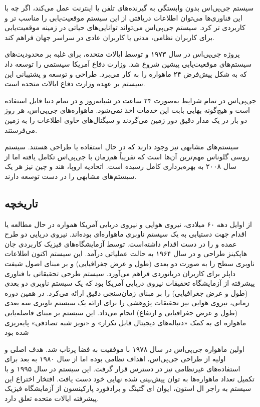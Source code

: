 سیستم جی‌پی‌اس بدون وابستگی به گیرنده‌های تلفن یا اینترنت عمل می‌کند، اگر چه با این فناوری‌ها می‌توان اطلاعات دریافتی از این سیستم موقعیت‌یابی را مناسب تر و کاربردی تر کرد. سیستم جی‌پی‌اس می‌تواند توانایی‌های حیاتی در زمینه موقعیت‌یابی برای کاربران نظامی، مدنی یا کاربران عادی در سراسر جهان فراهم کند. 


پروژه جی‌پی‌اس در سال ۱۹۷۳ و توسط ایالات متحده، برای غلبه بر محدودیت‌های سیستم‌های موقعیت‌یابی پیشین شروع شد. وزارت دفاع آمریکا سیستمی را توسعه داد که به شکل پیش‌فرض ۲۴ ماهواره را به کار می‌برد. طراحی و توسعه و پشتیبانی این سیستم بر عهده وزارت دفاع ایالات متحده است.


جی‌پی‌اس در تمام شرایط به‌صورت ۲۴ ساعت در شبانه‌روز و در تمام دنیا قابل استفاده‌ است و هیچ‌گونه بهایی بابت این خدمات اخذ نمی‌شود. ماهواره‌های جی‌پی‌اس، هر روز دو بار در یک مدار دقیق دور زمین می‌گردند و سیگنال‌های حاوی اطلاعات را به زمین می‌فرستند.


سیستم‌های مشابهی نیز وجود دارند که در حال استفاده یا طراحی هستند. سیستم روسی گلوناس مهم‌ترین آن‌ها است که تقریباً هم‌زمان با جی‌پی‌اس تکامل یافته اما از سال ۲۰۰۸ به بهره‌برداری کامل رسیده‌ است. اتحادیه اروپا، هند و چین نیز هر یک سیستم‌های مشابهی را در دست توسعه دارند.

\subsection{تاریخچه}
از اوایل دهه ۶۰ میلادی، نیروی هوایی و نیروی دریایی آمریکا همواره در حال مطالعه یا اقدام جهت دستیابی به یک سیستم ناوبری ماهواره‌ای بوده‌اند. نیروی دریایی دو طرح عمده  و  را در دست اقدام داشته‌است.  توسط آزمایشگاه‌های فیزیک کاربردی جان هاپکینز طراحی و در سال ۱۹۶۴ به حالت عملیاتی درآمد. این سیستم اکنون اطلاعات ناوبری سطح را به‌ صورت دو بعدی (طول و عرض جغرافیایی) و بر مبنای اصول شیفت داپلر برای کاربران دریانوردی فراهم می‌آورد. سیستم   طرحی تحقیقاتی با فناوری پیشرفته از آزمایشگاه تحقیقات نیروی دریایی آمریکا بود که یک سیستم ناوبری دو بعدی (طول و عرض جغرافیایی) را بر مبنای زمان‌سنجی دقیق ارائه می‌کرد. در همین دوره زمانی، نیروی هوایی نیز تحقیقات پژوهشی را برای ارائه یک سیستم ناوبری سه بعدی (طول و عرض جغرافیایی و ارتفاع) انجام می‌داد. این سیستم بر مبنای فاصله‌یابی ماهواره ای به کمک «دنباله‌های دیجیتال قابل تکرار» و «نویز شبه تصادفی» پایه‌ریزی شده بود

اولین ماهواره جی‌پی‌اس در سال ۱۹۷۸ با موفقیت به فضا پرتاب شد. هدف اصلی و اولیه از طراحی جی‌پی‌اس، اهداف نظامی بوده اما از سال ۱۹۸۰ به بعد برای استفاده‌های غیرنظامی نیز در دسترس قرار گرفت. این سیستم در سال ۱۹۹۵ و با تکمیل تعداد ماهواره‌ها به توان پیش‌بینی شده نهایی خود دست یافت. افتخار اختراع این سیستم به راجر ال استون، ایوان ای گتینگ و برادفورد پارکینسون از آزمایشگاه فیزیک پیشرفته ایالات متحده تعلق دارد.


